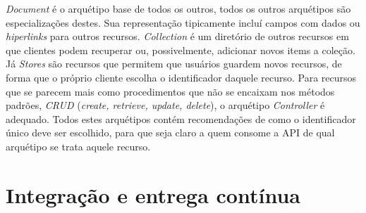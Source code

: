 \emph{Document} é o arquétipo base de todos os outros, todos os outros arquétipos são especializações 
destes. Sua representação tipicamente incluí campos com dados ou \emph{hiperlinks} para outros 
recursos. \emph{Collection} é um diretório de outros recursos em que clientes podem recuperar 
ou, possivelmente, adicionar novos items a coleção. Já \emph{Stores} são recursos que permitem 
que usuários guardem novos recursos, de forma que o próprio cliente escolha o 
identificador daquele recurso. Para recursos que se parecem mais como procedimentos que 
não se encaixam nos métodos padrões, \emph{CRUD} (\emph{create, retrieve, update, delete}),
  o arquétipo \emph{Controller} é adequado. Todos estes arquétipos 
  contém recomendações de como o identificador único deve ser escolhido, para que seja 
  claro a quem consome a API de qual arquétipo se trata aquele recurso.
  

\section{Integração e entrega contínua}
